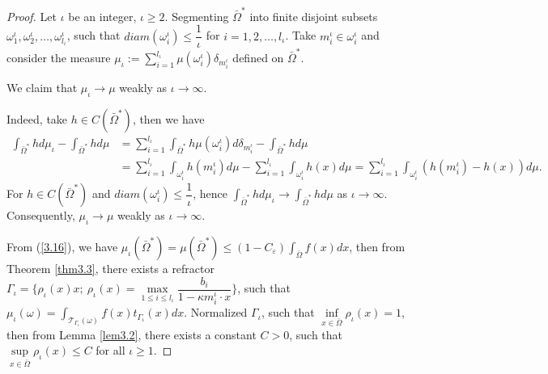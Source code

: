 \documentclass[a4paper,12pt,]{article}
\numberwithin{equation}{section}
\numberwithin{equation}{section} \allowdisplaybreaks
\begin{document}
\begin{proof}
  Let $\iota$ be an integer, $\iota \geq 2$. Segmenting $\bar{\Omega}^{\ast}$ into finite disjoint subsets $\omega_{1}^{\iota}, \omega_{2}^{\iota}, \ldots,\omega_{l_{\iota}}^{\iota}$, such that $diam(\omega_{i}^{\iota}) \leq \dfrac{1}{\iota}$ for $i = 1,2,\ldots,l_{\iota}$. Take $m_{i}^{\iota} \in \omega_{i}^{\iota}$ and consider the measure $\mu_{\iota} := \sum\limits_{i = 1}^{l _{\iota}}\mu(\omega_{i}^{\iota}) \delta_{m_{i}^{\iota}}$ defined on $\bar{\Omega}^{\ast}$.

  We claim that $\mu_{\iota} \rightarrow \mu$ weakly as $\iota \rightarrow \infty$.

  Indeed, take $h \in C(\bar{\Omega}^{\ast})$, then we have
  \begin{align*}
    \int_{\bar{\Omega}^{\ast}}h d\mu_{\iota} - \int_{\bar{\Omega}^{\ast}}h d\mu & = \sum_{i = 1}^{l_{\iota}}\int_{\bar{\Omega}^{\ast}}h\mu(\omega_{i}^{\iota})d\delta_{m_{i}^{\iota}} - \int_{\bar{\Omega}^{\ast}}h d\mu \\
      & = \sum_{i = 1}^{l_{\iota}} \int_{\omega_{i}^{\iota}} h(m_{i}^{\iota})d\mu - \sum_{i = 1}^{l_{\iota}}\int_{\omega_{i}^{\iota}}h(x)d\mu 
        = \sum_{i = 1}^{l_{\iota}} \int_{\omega_{i}^{\iota}}(h(m_{i}^{\iota}) - h(x))d\mu.
  \end{align*}
  For $h \in C(\bar{\Omega}^{\ast})$ and $diam(\omega_{i}^{\iota}) \leq \dfrac{1}{\iota}$, hence $\displaystyle\int_{\bar{\Omega}^{\ast}}hd\mu_{\iota} \rightarrow \displaystyle\int_{\bar{\Omega}^{\ast}}hd\mu$ as $\iota \rightarrow \infty$. Consequently, $\mu_{\iota} \rightarrow \mu$ weakly as $\iota \rightarrow \infty$.

  From (\ref{3.16}), we have $\mu_{\iota}(\bar{\Omega}^{\ast}) = \mu(\bar{\Omega}^{\ast}) \leq (1 - C_{\varepsilon})\displaystyle\int_{\bar{\Omega}}f(x)dx$, then from Theorem \ref{thm3.3}, there exists a refractor $\Gamma_{\iota} = \{\rho_{\iota}(x)x;~\rho_{\iota}(x) = \max\limits_{1 \leq i \leq l_{\iota}}\dfrac{b_{i}}{1 - \kappa m_{i}^{\iota} \cdot x}\}$, such that $\mu_{\iota}(\omega) = \displaystyle\int_{\mathcal{T}_{\Gamma_{\iota}}(\omega)}f(x)t_{\Gamma_{\iota}}(x)dx$. Normalized $\Gamma_{\iota}$, such that $\inf\limits_{x \in \bar{\Omega}}\rho_{\iota}(x) = 1$, then from Lemma \ref{lem3.2}, there exists a constant $C>0$, such that $\sup\limits_{x \in \bar{\Omega}}\rho_{\iota}(x) \leq C$ for all $\iota \geq 1$.


\end{proof}
\end{document}
